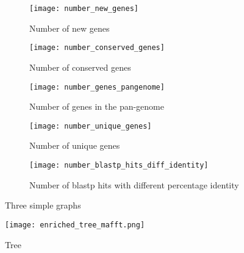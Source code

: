\graphicspath{{images/pangenomeAnalysis/}{images/phylogeneticStructureHostData}}


\begin{figure}[h!] 
     \centering
     \begin{subfigure}[b]{0.45\textwidth}
        \centering
        \texttt{[image: number\_new\_genes]}
        \caption{Number of new genes}
        \label{fig:new genes}
     \end{subfigure}
     \hfill
     \begin{subfigure}[b]{0.45\textwidth}
        \centering
        \texttt{[image: number\_conserved\_genes]}
        \caption{Number of conserved genes}
        \label{fig:conserved genes}
     \end{subfigure}
     \hfill
     \begin{subfigure}[b]{0.45\textwidth}
        \centering
        \texttt{[image: number\_genes\_pangenome]}
        \caption{Number of genes in the pan-genome}
        \label{fig:pagenome genes}
     \end{subfigure}
     \hfill
     \begin{subfigure}[b]{0.45\textwidth}
        \centering
        \texttt{[image: number\_unique\_genes]}
        \caption{Number of unique genes}
        \label{fig:unique genes}
     \end{subfigure}
     \hfill
     \begin{subfigure}[b]{0.45\textwidth}
        \centering
        \texttt{[image: number\_blastp\_hits\_diff\_identity]}
        \caption{Number of blastp hits with different percentage identity}
        \label{fig:blastp identity}
     \end{subfigure}
        \caption{Three simple graphs}
        \label{fig:genes vs genomes}
\end{figure}




\begin{figure}
   \centering
   \texttt{[image: enriched\_tree\_mafft.png]}
   \caption{Tree}
   \label{core alignement mafft tree}
\end{figure}


